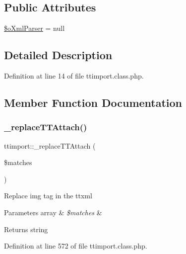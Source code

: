 \subsection*{Public Attributes}
\begin{DoxyCompactItemize}
\item 
\hyperlink{classttimport_af3932f8dbd65a917d2d41e001bae4e87}{\$o\+Xml\+Parser} = null
\end{DoxyCompactItemize}


\subsection{Detailed Description}


Definition at line 14 of file ttimport.\+class.\+php.



\subsection{Member Function Documentation}
\hypertarget{classttimport_a14327afa66ec130f1a0be24a7b5c7160}{}\label{classttimport_a14327afa66ec130f1a0be24a7b5c7160} 
\subsubsection{\texorpdfstring{\+\_\+replace\+T\+T\+Attach()}{\_replaceTTAttach()}}
{\footnotesize\ttfamily ttimport\+::\+\_\+replace\+T\+T\+Attach (\begin{DoxyParamCaption}\item[{}]{\$matches }\end{DoxyParamCaption})}

Replace img tag in the ttxml 
\begin{DoxyParams}[1]{Parameters}
array & {\em \$matches} & \\
\hline
\end{DoxyParams}
\begin{DoxyReturn}{Returns}
string 
\end{DoxyReturn}


Definition at line 572 of file ttimport.\+class.\+php.

\hypertarget{classttimport_a30eac1bf295a9bfd0a7bc60292a07f06}{}\label{classttimport_a30eac1bf295a9bfd0a7bc60292a07f06} 
